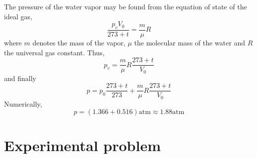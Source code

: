 \documentclass[12pt,a4paper]{book}
\begin{document}
	The pressure of the water vapor may be found from the equation of state of the ideal gas,
	\begin{equation*}
		\frac{p_vV_0}{273+t}=\frac{m}{\mu}R
	\end{equation*}
	where $m$ denotes the mass of the vapor, $\mu$ the molecular mass of the water and $R$ the universal gas constant. Thus,
	\begin{equation*}
		p_v=\frac{m}{\mu}R\frac{273+t}{V_0}
	\end{equation*}
	and finally
	\begin{equation}
		p=p_0\frac{273+t}{273}+\frac{m}{\mu}R\frac{273+t}{V_0}
	\end{equation}
	Numerically,
	\begin{equation*}
		p=(1.366+0.516)\text{atm}\approx1.88\text{atm}
	\end{equation*}
\section*{Experimental problem}
\end{document}
